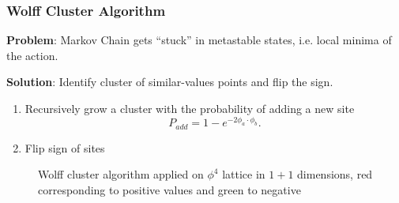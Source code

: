 \documentclass{beamer}
\begin{document}
\begin{frame}
    \frametitle{Wolff Cluster Algorithm}
        \textbf{Problem}: Markov Chain gets ``stuck'' in metastable states, i.e. local minima of the action.

        \textbf{Solution}: Identify cluster of similar-values points and flip the sign.
    \begin{enumerate}
        \item Recursively grow a cluster with the probability of adding a new site
        \begin{equation*}
            P_{add} = 1-e^{-2\phi_a\cdot\phi_b}.
        \end{equation*}
        \item Flip sign of sites
    

    \end{enumerate}
    \begin{figure}[h]

      \centering
          \caption{Wolff cluster algorithm applied on $\phi^4$ lattice in $1+1$ dimensions, red corresponding to positive values and green to negative}
      \label{fig:flow}
    \end{figure}
\end{frame}
\end{document}
